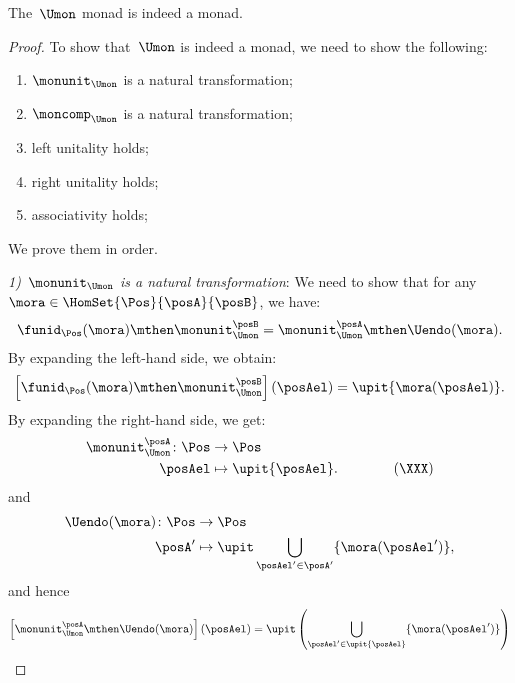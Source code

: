 \begin{lemma}
	The~$\Umon$ monad is indeed a monad.
\end{lemma}
\begin{proof}
	To show that~$\Umon$ is indeed a monad, we need to show the following:
	\begin{enumerate}
		\item $\monunit_{\Umon}$ is a natural transformation;
		\item $\moncomp_{\Umon}$ is a natural transformation;
		\item left unitality holds;
		\item right unitality holds;
		\item associativity holds;
	\end{enumerate}
	We prove them in order.

	\emph{1)~$\monunit_{\Umon}$ is a natural transformation}:
	We need to show that for any~$\mora\in \HomSet{\Pos}{\posA}{\posB}$, we have:
	\begin{equation}
		\funid_{\Pos}(\mora)\mthen \monunit_{\Umon}^\posB=\monunit_{\Umon}^\posA\mthen \Uendo(\mora).
	\end{equation}
	By expanding the left-hand side, we obtain:
	\begin{equation}
		\left[\funid_{\Pos}(\mora)\mthen \monunit_{\Umon}^\posB\right](\posAel)=\upit \{\mora(\posAel)\}.
	\end{equation}
	By expanding the right-hand side, we get:
	\begin{equation}
		\begin{aligned}
			\monunit_{\Umon}^\posA\colon \Pos & \to \Pos                   \\
			\posAel                           & \mapsto \upit \{\posAel\}.
			\qquad \qquad (\XXX)
		\end{aligned}
	\end{equation}
	and
	\begin{equation}
		\begin{aligned}
			\Uendo(\mora)\colon \Pos & \to \Pos                                                       \\
			\posA'                   & \mapsto \upit \bigcup_{\posAel'\in \posA'}\{\mora(\posAel')\},
		\end{aligned}
	\end{equation}
	and hence
	\begin{equation}
		\begin{aligned}
			\left[\monunit_{\Umon}^\posA\mthen \Uendo(\mora)\right](\posAel) & =\upit \left( \bigcup_{\posAel'\in \upit \{\posAel\}} \{\mora(\posAel')\}\right) \\

\end{aligned}
\end{equation}
\end{proof}
